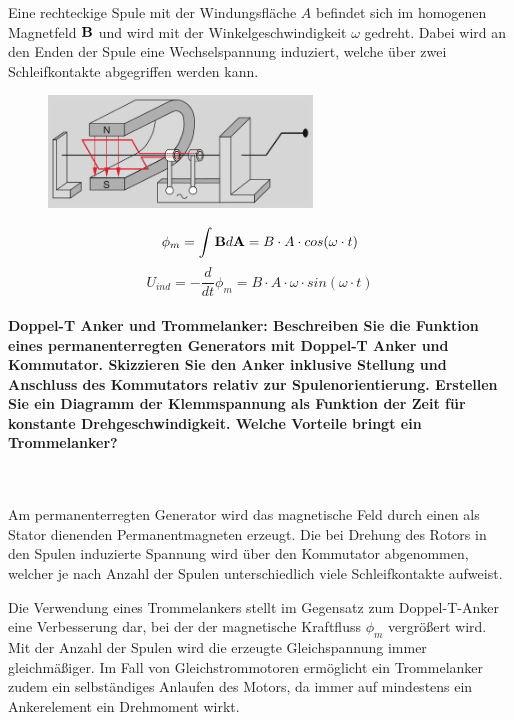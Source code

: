 \documentclass[a4paper, 11pt, ngerman, parskip=half-]{scrartcl}
\begin{document}
Eine rechteckige Spule mit der Windungsfläche $A$ befindet sich im homogenen Magnetfeld $\bold{B}$
und wird mit der Winkelgeschwindigkeit $\omega$ gedreht. Dabei wird an den Enden der Spule eine
Wechselspannung induziert, welche über zwei Schleifkontakte abgegriffen werden kann.

\begin{figure}[H]
    \centering
    \includegraphics[width=7cm]{image/08/1}
\end{figure}

\begin{equation}
    \phi_m = \int \bold{B} d\bold{A} = B \cdot A \cdot cos(\omega \cdot t)
\end{equation}
\begin{equation}
    U_{ind} = - \frac{d}{dt} \phi_m = B \cdot A \cdot \omega \cdot sin(\omega \cdot t)
\end{equation}

\paragraph{Doppel-T Anker und Trommelanker: Beschreiben Sie die Funktion eines permanenterregten
    Generators mit Doppel-T Anker und Kommutator. Skizzieren Sie den Anker inklusive Stellung und
    Anschluss des Kommutators relativ zur Spulenorientierung. Erstellen Sie ein Diagramm der
    Klemmspannung als Funktion der Zeit für konstante Drehgeschwindigkeit. Welche Vorteile bringt ein
    Trommelanker?} ~

Am permanenterregten Generator wird das magnetische Feld durch einen als Stator dienenden
Permanentmagneten erzeugt. Die bei Drehung des Rotors in den Spulen induzierte Spannung wird über
den Kommutator abgenommen, welcher je nach Anzahl der Spulen unterschiedlich viele Schleifkontakte
aufweist.

Die Verwendung eines Trommelankers stellt im Gegensatz zum Doppel-T-Anker eine Verbesserung dar,
bei der der magnetische Kraftfluss $\phi_m$ vergrößert wird. Mit der Anzahl der Spulen wird die
erzeugte Gleichspannung immer gleichmäßiger. Im Fall von Gleichstrommotoren ermöglicht ein
Trommelanker zudem ein selbständiges Anlaufen des Motors, da immer auf mindestens ein Ankerelement
ein Drehmoment wirkt.
\end{document}
